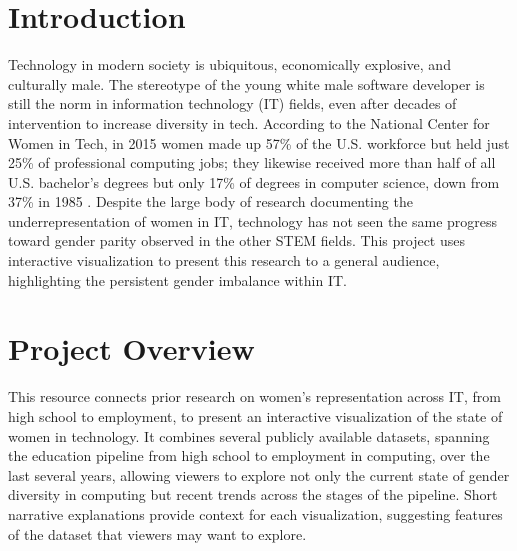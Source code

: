 \documentclass{article}
\begin{document}
\section{Introduction}
Technology in modern society is ubiquitous, economically explosive, and culturally male. The stereotype of the young white male software developer is still the norm in information technology (IT) fields, even after decades of intervention to increase diversity in tech. According to the National Center for Women in Tech, in 2015 women made up 57\% of the U.S. workforce but held just 25\% of professional computing jobs; they likewise received more than half of all U.S. bachelor's degrees but only 17\% of degrees in computer science, down from 37\% in 1985 \citep{NCWIT2016Women}. Despite the large body of research documenting the underrepresentation of women in IT, technology has not seen the same progress toward gender parity observed in the other STEM fields. This project uses interactive visualization to present this research to a general audience, highlighting the persistent gender imbalance within IT\@.




\section{Project Overview}
This resource connects prior research on women's representation across IT, from high school to employment, to present an interactive visualization of the state of women in technology. It combines several publicly available datasets, spanning the education pipeline from high school to employment in computing, over the last several years, allowing viewers to explore not only the current state of gender diversity in computing but recent trends across the stages of the pipeline. Short narrative explanations provide context for each visualization, suggesting features of the dataset that viewers may want to explore.










\end{document}
